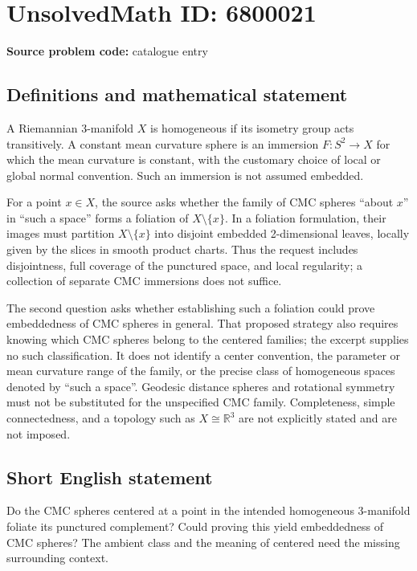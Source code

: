 \documentclass[11pt]{article}
\newcommand{\R}{\mathbb{R}}
\begin{document}
\section*{UnsolvedMath ID: 6800021}
\textbf{Source problem code:} catalogue entry
\subsection{Definitions and mathematical statement}
A Riemannian 3-manifold \(X\) is homogeneous if its isometry group acts transitively. A constant mean curvature sphere is an immersion \(F:S^2\to X\) for which the mean curvature is constant, with the customary choice of local or global normal convention. Such an immersion is not assumed embedded.

For a point \(x\in X\), the source asks whether the family of CMC spheres ``about \(x\)'' in ``such a space'' forms a foliation of \(X\setminus\{x\}\). In a foliation formulation, their images must partition \(X\setminus\{x\}\) into disjoint embedded 2-dimensional leaves, locally given by the slices in smooth product charts. Thus the request includes disjointness, full coverage of the punctured space, and local regularity; a collection of separate CMC immersions does not suffice.

The second question asks whether establishing such a foliation could prove embeddedness of CMC spheres in general. That proposed strategy also requires knowing which CMC spheres belong to the centered families; the excerpt supplies no such classification. It does not identify a center convention, the parameter or mean curvature range of the family, or the precise class of homogeneous spaces denoted by ``such a space''. Geodesic distance spheres and rotational symmetry must not be substituted for the unspecified CMC family. Completeness, simple connectedness, and a topology such as \(X\cong\R^3\) are not explicitly stated and are not imposed.
\subsection{Short English statement}
Do the CMC spheres centered at a point in the intended homogeneous 3-manifold foliate its punctured complement? Could proving this yield embeddedness of CMC spheres? The ambient class and the meaning of centered need the missing surrounding context.
\end{document}
